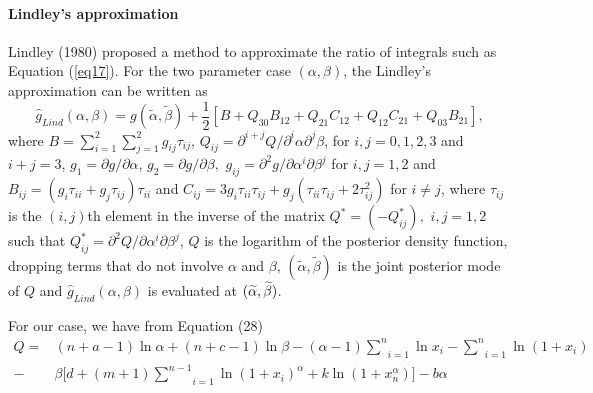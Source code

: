 \documentclass[a4paper, 11pt]{article}
\numberwithin{equation}{section}
\begin{document}
\paragraph{Lindley's approximation}

Lindley (1980) proposed a method to approximate the ratio of integrals such
as Equation (\ref{eq17}). For the two parameter case $(\alpha ,\beta )$, the Lindley's approximation can be
written as 
\begin{equation}
\widehat{g}_{Lind}(\alpha ,\beta )=g(\widetilde{\alpha },\widetilde{\beta })+%
\frac{1}{2}\left[ B+Q_{30}B_{12}+Q_{21}C_{12}+Q_{12}C_{21}+Q_{03}B_{21}%
\right] ,  \label{eq18}
\end{equation}%
where $B=\sum_{i=1}^{2}\sum_{j=1}^{2}g_{ij}\tau _{ij}$, $Q_{ij}=\partial
^{i+j}Q/\partial ^{i}\alpha \partial ^{j}\beta $, for $i,j=0,1,2,3$ and $%
i+j=3$, $g_{1}=\partial g/\partial \alpha $, $g_{2}=\partial g/\partial
\beta ,$ $g_{ij}=\partial ^{2}g/\partial \alpha ^{i}\partial \beta ^{j}$ for 
$i,j=1,2$ and $B_{ij}=(g_{i}\tau _{ii}+g_{j}\tau _{ij})\tau _{ii}$ and $%
C_{ij}=3g_{i}\tau _{ii}\tau _{ij}+g_{j}(\tau _{ii}\tau _{ij}+2\tau
_{ij}^{2}) $ for $i\neq j$, where $\tau _{ij}$ is the $(i,j)$th element in
the inverse of the matrix $Q^{\ast }=(-Q_{ij}^{\ast }),$ $i,j=1,2$ such that 
$Q_{ij}^{\ast }=\partial ^{2}Q/\partial \alpha ^{i}\partial \beta ^{j}$, $Q$
is the logarithm of the posterior density function, dropping terms that do not involve $\alpha$ and $\beta$,
$(\widetilde{\alpha },%
\widetilde{\beta })$ is the joint posterior mode of $Q$ and $\widehat{g}%
_{Lind}(\alpha ,\beta )$ is evaluated at $(\widetilde{\alpha },\widetilde{%
\beta })$.

For our case, we have from Equation (28) %
\begin{equation}
\begin{aligned}
Q=&(n+a-1)\ln \alpha +(n+c-1)\ln \beta -(\alpha-1)\underset{i=1}{\overset{n}{\sum }}\ln x_{i}- \underset{i=1}{\overset{n}{\sum }}\ln (1+x_{i}) \\
-&\beta \big[ d+(m+1)\underset{i=1}{\overset{n-1}{\sum }}\ln (1+x_{i})^{\alpha} +k \ln(1+x_{n}^{\alpha}) \big]-b \alpha 
\end{aligned}
\end{equation}%
\end{document}
